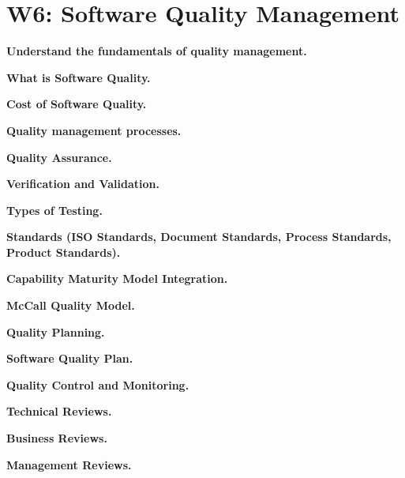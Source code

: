 \section{W6: Software Quality Management}

\textbf{Understand the fundamentals of quality management.}

    \textbf{What is Software Quality.}

    \textbf{Cost of Software Quality.}

\textbf{Quality management processes.}

    \textbf{Quality Assurance.}

        \textbf{Verification and Validation.}

        \textbf{Types of Testing.}

        \textbf{Standards (ISO Standards, Document Standards, Process Standards, Product Standards).}

        \textbf{Capability Maturity Model Integration.}

        \textbf{McCall Quality Model.}

    \textbf{Quality Planning.}

        \textbf{Software Quality Plan.}

        \textbf{Quality Control and Monitoring.}

        \textbf{Technical Reviews.}

        \textbf{Business Reviews.}

        \textbf{Management Reviews.}